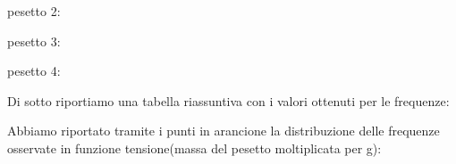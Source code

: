 \documentclass[a4paper]{article}
\theoremstyle{definition}
\begin{document}
	pesetto 2:
	\begin{figure}[!ht]
	\end{figure}
	
	pesetto 3:
	\begin{figure}[!ht]
	\end{figure}

	pesetto 4:
	\begin{figure}[!ht]
	\end{figure}


	\noindent Di sotto riportiamo una tabella riassuntiva con i valori ottenuti per le frequenze:\\
	
\begin{figure}[!ht]
\end{figure}


\noindent Abbiamo riportato tramite i punti in arancione la distribuzione delle frequenze osservate in funzione tensione(massa del pesetto moltiplicata per g):
 
\end{document}
